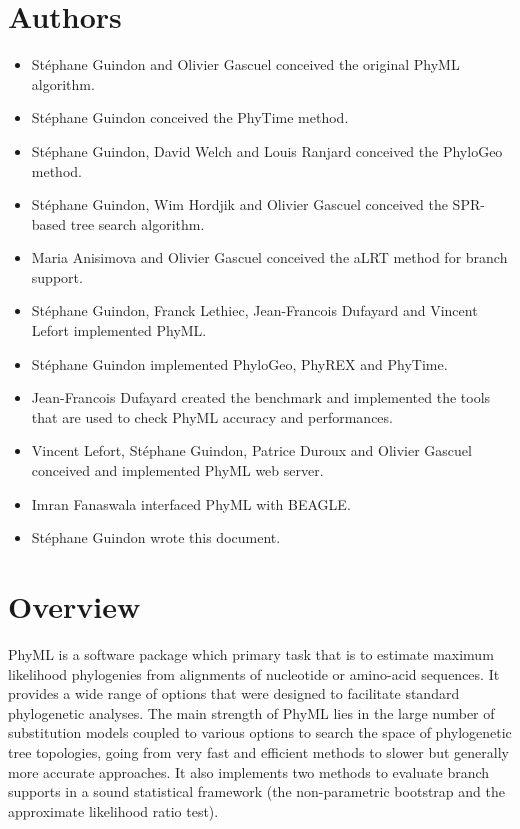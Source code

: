 \documentclass[a4paper,12pt]{article}
\begin{document}
{
\noindent
\setlength{\baselineskip}{0.7\baselineskip}
\section{Authors}
\begin{itemize}
\item { St\'ephane Guindon} and { Olivier Gascuel} conceived the original PhyML algorithm.
\item { St\'ephane Guindon} conceived the PhyTime method.
\item { St\'ephane Guindon, David Welch and Louis Ranjard} conceived the PhyloGeo method.
\item { St\'ephane Guindon, Wim Hordjik} and { Olivier Gascuel} conceived the SPR-based tree search algorithm.
\item { Maria Anisimova} and { Olivier Gascuel} conceived the aLRT method for branch support.
\item { St\'ephane Guindon, Franck Lethiec}, Jean-Francois Dufayard and Vincent Lefort implemented PhyML.
\item St\'ephane Guindon implemented PhyloGeo, PhyREX and PhyTime.
\item { Jean-Francois Dufayard} created the benchmark and implemented the tools that are used to check
  PhyML accuracy and performances.
\item { Vincent Lefort, St\'ephane Guindon, Patrice Duroux} and { Olivier Gascuel} conceived and
  implemented PhyML web server.
\item { Imran Fanaswala} interfaced PhyML with BEAGLE.
\item St\'ephane Guindon wrote this document.
\end{itemize}
}
\clearpage

\section{Overview}

PhyML  \cite{guindon03} is  a  software  package which  primary  task that  is  to estimate  maximum
likelihood phylogenies  from alignments of nucleotide or  amino-acid sequences.  It  provides a wide
range  of  options that  were  designed  to facilitate  standard  phylogenetic  analyses.  The  main
strength of  PhyML lies in the  large number of substitution  models coupled to  various options to
search the  space of phylogenetic  tree topologies,  going from very  fast and efficient  methods to
slower but  generally more accurate approaches.  It  also implements two methods  to evaluate branch
supports  in  a  sound statistical  framework  (the  non-parametric  bootstrap and  the  approximate
likelihood ratio test).
\end{document}
